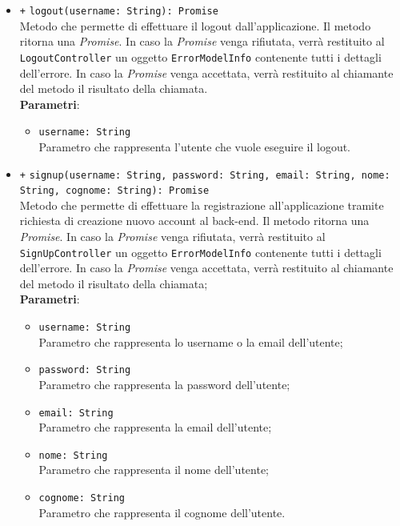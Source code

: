 \begin{itemize}
\begin{itemize}
		\item \texttt{+} \texttt{logout(username: String): Promise} \\ Metodo che permette di effettuare il logout dall'applicazione. Il metodo ritorna una \textit{Promise}. In caso la \textit{Promise} venga rifiutata, verrà restituito al \texttt{LogoutController} un oggetto \texttt{ErrorModelInfo} contenente tutti i dettagli dell'errore. In caso la \textit{Promise} venga accettata, verrà restituito al chiamante del metodo il risultato della chiamata.\\
		\textbf{Parametri}:
		\begin{itemize}
			\item \texttt{username: String} \\ Parametro che rappresenta l'utente che vuole eseguire il logout.
		\end{itemize}
		
		\item \texttt{+} \texttt{signup(username: String, password: String, email: String, nome: String, cognome: String): Promise} \\Metodo che permette di effettuare la registrazione all'applicazione tramite richiesta di creazione nuovo account al back-end. Il metodo ritorna una \textit{Promise}. In caso la \textit{Promise} venga rifiutata, verrà restituito al \texttt{SignUpController} un oggetto \texttt{ErrorModelInfo} contenente tutti i dettagli dell'errore. In caso la \textit{Promise} venga accettata, verrà restituito al chiamante del metodo il risultato della chiamata; \\
			\textbf{Parametri}:
			\begin{itemize}
				\item \texttt{username: String} \\ Parametro che rappresenta lo username o la email dell'utente;
				\item \texttt{password: String} \\ Parametro che rappresenta la password dell'utente;
				\item \texttt{email: String} \\ Parametro che rappresenta la email dell'utente;
				\item \texttt{nome: String} \\ Parametro che rappresenta il nome dell'utente;
				\item \texttt{cognome: String} \\ Parametro che rappresenta il cognome dell'utente.
			\end{itemize}
			

\end{itemize}
\end{itemize}
